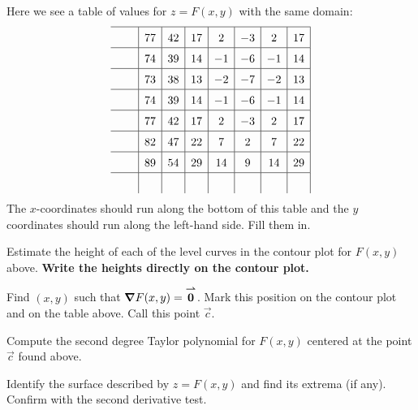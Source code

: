 \documentclass[handout,noauthor,nooutcomes]{ximera}
\begin{document}
\begin{problem}
Here we see a table of values for $z= F(x,y)$ with the same domain:
\[
\renewcommand*{\arraystretch}{1.5}
\begin{array}{c|c|c|c|c|c|c|c|}\hline
\rule{.5cm}{0cm} & 77 & 42 & 17 & 2 & -3 & 2 & 17 \\ \hline
 & 74 & 39 & 14 & -1 & -6 & -1 & 14 \\ \hline
 & 73 & 38 & 13 & -2 & -7 & -2 & 13 \\ \hline
 & 74 & 39 & 14 & -1 & -6 & -1 & 14 \\ \hline
 & 77 & 42 & 17 & 2 & -3 & 2 & 17 \\ \hline
 & 82 & 47 & 22 & 7 & 2 & 7 & 22 \\ \hline
 & 89 & 54 & 29 & 14 & 9 & 14 & 29 \\ \hline
 &    &    &    &    &   &    & 
\end{array}
\]
The $x$-coordinates should run along the bottom of this table and the
$y$ coordinates should run along the left-hand side. Fill them in.
\end{problem}

\begin{problem}
Estimate the height of each of the level curves in the contour plot
for $F(x,y)$ above. \textbf{Write the heights directly on the contour
  plot.}
\end{problem}

\begin{problem}
Find $(x,y)$ such that $\boldsymbol\nabla F(x,y) = {\overset{\boldsymbol{\rightharpoonup}}{\mathbf{0}}}$. Mark this position on the
contour plot and on the table above. Call this point $\vec{c}$.
\end{problem}


\begin{problem}
  Compute the second degree Taylor polynomial for $F(x,y)$ centered at
  the point $\vec{c}$ found above.
\end{problem}



\begin{problem}
  Identify the surface described by $z = F(x,y)$ and find its
  extrema (if any). Confirm with the second derivative test.
\end{problem}





\newpage
\end{document}
